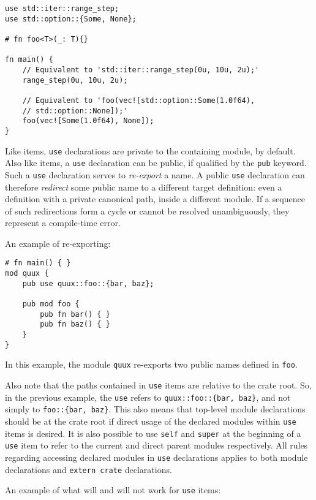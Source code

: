 \documentclass[]{article}
\begin{document}
\begin{verbatim}
use std::iter::range_step;
use std::option::{Some, None};

# fn foo<T>(_: T){}

fn main() {
    // Equivalent to 'std::iter::range_step(0u, 10u, 2u);'
    range_step(0u, 10u, 2u);

    // Equivalent to 'foo(vec![std::option::Some(1.0f64),
    // std::option::None]);'
    foo(vec![Some(1.0f64), None]);
}
\end{verbatim}

Like items, \texttt{use} declarations are private to the containing
module, by default. Also like items, a \texttt{use} declaration can be
public, if qualified by the \texttt{pub} keyword. Such a \texttt{use}
declaration serves to \emph{re-export} a name. A public \texttt{use}
declaration can therefore \emph{redirect} some public name to a
different target definition: even a definition with a private canonical
path, inside a different module. If a sequence of such redirections form
a cycle or cannot be resolved unambiguously, they represent a
compile-time error.

An example of re-exporting:

\begin{verbatim}
# fn main() { }
mod quux {
    pub use quux::foo::{bar, baz};

    pub mod foo {
        pub fn bar() { }
        pub fn baz() { }
    }
}
\end{verbatim}

In this example, the module \texttt{quux} re-exports two public names
defined in \texttt{foo}.

Also note that the paths contained in \texttt{use} items are relative to
the crate root. So, in the previous example, the \texttt{use} refers to
\texttt{quux::foo::\{bar, baz\}}, and not simply to
\texttt{foo::\{bar, baz\}}. This also means that top-level module
declarations should be at the crate root if direct usage of the declared
modules within \texttt{use} items is desired. It is also possible to use
\texttt{self} and \texttt{super} at the beginning of a \texttt{use} item
to refer to the current and direct parent modules respectively. All
rules regarding accessing declared modules in \texttt{use} declarations
applies to both module declarations and \texttt{extern crate}
declarations.

An example of what will and will not work for \texttt{use} items:
\end{document}
